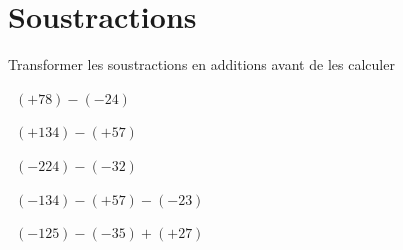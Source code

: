 \section{Soustractions}

Transformer les soustractions en additions avant de les calculer
\begin{questions}
	\question[2]  $(+78) - (-24)$
	\fillwithdottedlines{2cm}
	\begin{solution}
		
	\end{solution}	
	
	
	\question[2]  $(+134) - (+57)$
	\fillwithdottedlines{2cm}
	\begin{solution}
		
	\end{solution}	
	
	\question[2]  $(-224) - (-32)$
	\fillwithdottedlines{2cm}
	\begin{solution}
		
	\end{solution}	
	
	
	\question[2]  $(-134) - (+57) - (-23) $
	\fillwithdottedlines{2cm}
	\begin{solution}
		
	\end{solution}
	
	\question[2]  $(-125) - (-35) + (+27) $
	\fillwithdottedlines{2cm}
	\begin{solution}
		
	\end{solution}
\end{questions}